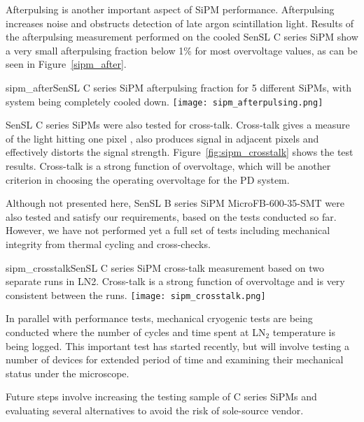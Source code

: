 Afterpulsing is another important aspect of SiPM
performance. Afterpulsing increases noise and obstructs detection of
late argon scintillation light. Results of the afterpulsing
measurement performed on the cooled SenSL C series SiPM show a
very small afterpulsing fraction below 1\% for most overvoltage
values, as can be seen in Figure~\ref{sipm_after}.

\begin{cdrfigure}{sipm_after}{SenSL C series SiPM afterpulsing fraction for 5
    different SiPMs, with system being completely cooled down.}      
  \texttt{[image: sipm\_afterpulsing.png]}
\end{cdrfigure}

SenSL C series SiPMs were also tested for cross-talk. Cross-talk gives
a measure of the light hitting one pixel , also produces signal in
adjacent pixels and effectively distorts the signal
strength. Figure~\ref{fig:sipm_crosstalk} shows the test
results. Cross-talk is a strong function of overvoltage, which will be
another criterion in choosing the operating overvoltage for the PD
system.

Although not presented here, SenSL B series SiPM MicroFB-600-35-SMT
were also tested and satisfy our requirements, based on the tests
conducted so far. However, we have not performed yet a full set of
tests including mechanical integrity from thermal cycling and
cross-checks. 

\begin{cdrfigure}{sipm_crosstalk}{SenSL C series SiPM cross-talk measurement
    based on two separate runs in LN2. Cross-talk is a strong function
    of overvoltage and is very consistent between the runs.}       
  \texttt{[image: sipm\_crosstalk.png]}
\end{cdrfigure}

In parallel with performance tests, mechanical cryogenic tests are being
conducted where the number of cycles and time spent at LN$_2$ temperature
is being logged. This important test has started recently, but will
involve testing a number of devices for extended period of time and
examining their mechanical status under the microscope.%

Future steps involve increasing the testing sample of C series SiPMs
and evaluating several alternatives to avoid the risk of sole-source
vendor. 


